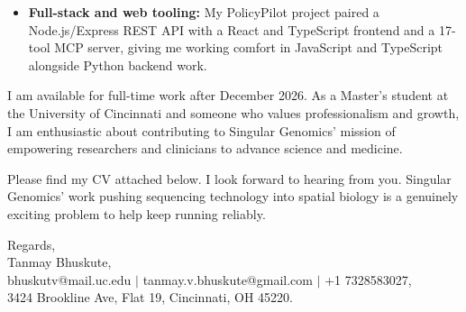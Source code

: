 \documentclass[11pt]{letter}
\begin{document}
\begin{letter}{}
\begin{itemize}[leftmargin=*, itemsep=0.45em]
    \item \textbf{Full-stack and web tooling:} My PolicyPilot project paired a Node.js/Express REST API with a React and TypeScript frontend and a 17-tool MCP server, giving me working comfort in JavaScript and TypeScript alongside Python backend work.
\end{itemize}

I am available for full-time work after December 2026. As a Master's student at the University of Cincinnati and someone who values professionalism and growth, I am enthusiastic about contributing to Singular Genomics' mission of empowering researchers and clinicians to advance science and medicine.

Please find my CV attached below. I look forward to hearing from you. Singular Genomics' work pushing sequencing technology into spatial biology is a genuinely exciting problem to help keep running reliably.

{\setlength{\parskip}{0pt}
Regards,\\
Tanmay Bhuskute,\\
bhuskutv@mail.uc.edu $\mid$ tanmay.v.bhuskute@gmail.com $\mid$ +1 7328583027,\\
3424 Brookline Ave, Flat 19, Cincinnati, OH 45220.
}

\end{letter}
\end{document}
